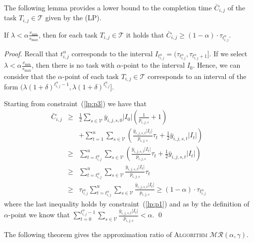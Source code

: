 \documentclass{llncs}
\newcommand{\algomr}{\textsc{Algorithm} $\mathcal{MR}(\alpha,\gamma)$\xspace}
\begin{document}
The following lemma provides a lower bound to the completion time $\bar{C}_{i,j}$ of the task $T_{i,j} \in \mathcal{T}$ given by the (LP).
\begin{lemma}
If $\lambda < \alpha \frac{v_{\min}}{s_{\max}}$, then
for each task $T_{i,j} \in \mathcal{T}$ it holds that $\bar{C}_{i,j}\geq(1-\alpha)\cdot\tau_{t_{i,j}^{\alpha}}$.
\label{le:Clowerbound}
\end{lemma}
\begin{proof}
Recall that $t_{i,j}^{\alpha}$ corresponds to the interval $I_{t_{i,j}^{\alpha}} = (\tau_{t_{i,j}^{\alpha}},\tau_{t_{i,j}^{\alpha}+1}]$.
If we select $\lambda < \alpha \frac{v_{\min}}{s_{\max}}$, then there is no task with $\alpha$-point to the interval $I_0$.
Hence, we can consider that the $\alpha$-point of each task $T_{i,j} \in \mathcal{T}$
corresponds to an interval of the form $(\lambda(1+\delta)^{t_{i,j}^{\alpha}-1},\lambda(1+\delta)^{t_{i,j}^{\alpha}}]$.

Starting from constraint~(\ref{lp:p3}) we have that
\begin{eqnarray*}
\bar{C}_{i,j} & \geq & \frac{1}{2} \sum_{s\in \mathcal{V}} \bar{y}_{i,j,s,0}|I_0| \left(\frac{1}{p_{i,j,s}} + 1 \right) \\
 && +\sum_{t=1}^u \sum_{s\in \mathcal{V}} \left(\frac{\bar{y}_{i,j,s,t}|I_t|}{p_{i,j,s}}\tau_t + \frac{1}{2} \bar{y}_{i,j,s,t}|I_t|\right)\\
 & \geq & \sum_{t=t_{i,j}^{\alpha}}^u \sum_{s\in \mathcal{V}} \left(\frac{\bar{y}_{i,j,s,t}|I_t|}{p_{i,j,s}}\tau_t + \frac{1}{2} \bar{y}_{i,j,s,t}|I_t|\right)\\
 & \geq & \sum_{t=t_{i,j}^{\alpha}}^u \sum_{s\in \mathcal{V}} \frac{\bar{y}_{i,j,s,t}|I_t|}{p_{i,j,s}}\tau_t \\
 & \geq & \tau_{t_{i,j}^{\alpha}} \sum_{t=t_{i,j}^{\alpha}}^u \sum_{s\in \mathcal{V}} \frac{\bar{y}_{i,j,s,t}|I_t|}{p_{i,j,s}}
 \geq (1-\alpha) \cdot \tau_{t_{i,j}^{\alpha}}
\end{eqnarray*}
where the last inequality holds by constraint~(\ref{lp:p1}) and as by the definition of $\alpha$-point we know that
$\sum_{t=0}^{t_{i,j}^{\alpha}-1} \sum_{s\in \mathcal{V}} \frac{\bar{y}_{i,j,s,t}|I_t|}{p_{i,j,s}} < \alpha$.
\qed
\end{proof}

The following theorem gives the approximation ratio of \algomr.
\end{document}
